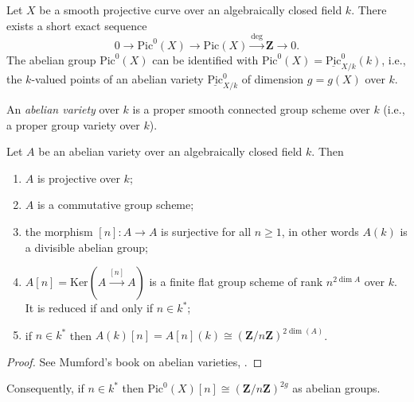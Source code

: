 \noindent
Let $X$ be a smooth projective curve over an algebraically closed field $k$.
There exists a short exact sequence
$$
0\to \text{Pic}^0(X) \to \text{Pic}(X)\xrightarrow{\deg} \mathbf{Z} \to 0.
$$
The abelian group $\text{Pic}^0(X)$ can be identified with $\text{Pic}^0(X) =
\underline{\text{Pic}}^0_{X/k}(k)$, i.e., the $k$-valued points of an
abelian variety $\underline{\text{Pic}}^0_{X/k}$ of dimension $g=g(X)$ over
$k$.

\begin{definition}
\label{definition-abelian-variety}
An {\it abelian variety} over $k$ is a proper smooth connected group scheme
over $k$ (i.e., a proper group variety over $k$).
\end{definition}

\begin{proposition}
\label{proposition-review-abelian-varieties}
Let $A$ be an abelian variety over an algebraically closed field $k$. Then
\begin{enumerate}
\item
$A$ is projective over $k$;
\item
$A$ is a commutative group scheme;
\item
the morphism $[n]: A\to A$ is surjective for all $n\geq 1$, in other words
$A(k)$ is a divisible abelian group;
\item
$A[n] = \text{Ker}(A\xrightarrow{[n]} A)$ is a finite flat group scheme of rank
$n^{2\dim A}$ over $k$. It is reduced if and only if $n\in k^*$;
\item
if $n\in k^*$ then $A(k)[n] = A[n](k)\cong(\mathbf{Z}/n\mathbf{Z})^{2\dim(A)}$.
\end{enumerate}
\end{proposition}

\begin{proof}
See Mumford's book on abelian varieties, \cite{AVar}.
\end{proof}

\noindent
Consequently, if $n\in k^*$ then $\text{Pic}^0(X)[n] \cong
\left(\mathbf{Z}/n\mathbf{Z}\right)^{2g}$ as abelian groups.


